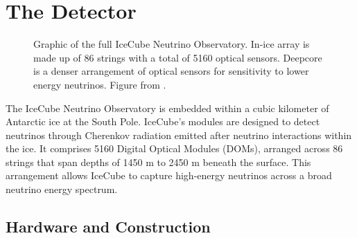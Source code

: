 \section{The Detector}

\begin{figure}
    \caption{Graphic of the full IceCube Neutrino Observatory. In-ice array is made up of 86 strings with a total of 5160 optical sensors. Deepcore is a denser arrangement of optical sensors for sensitivity to lower energy neutrinos. Figure from \cite{IceCube_SPGallery}.}
    \label{fig:IC3_full_detector}
\end{figure}

The IceCube Neutrino Observatory is embedded within a cubic kilometer of Antarctic ice at the South Pole.
IceCube's modules are designed to detect neutrinos through Cherenkov radiation emitted after neutrino interactions within the ice.
It comprises 5160 Digital Optical Modules (DOMs), arranged across 86 strings that span depths of 1450 m to 2450 m beneath the surface.
This arrangement allows IceCube to capture high-energy neutrinos across a broad neutrino energy spectrum.

\subsection{Hardware and Construction}

